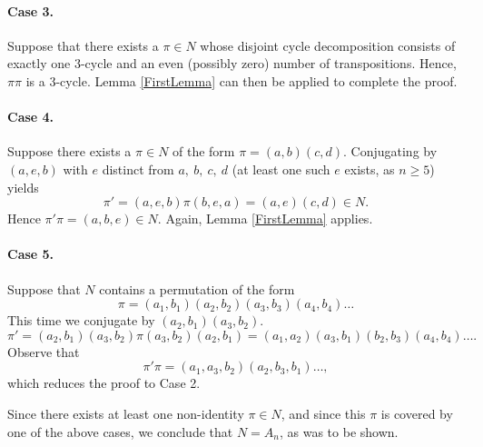 \documentclass[12pt]{article}
\begin{document}
\paragraph{Case 3.}
Suppose that there exists a $\pi \in N$ whose disjoint cycle
decomposition consists of exactly one $3$-cycle and an even (possibly
zero) number of transpositions.  Hence, $\pi \pi$ is a $3$-cycle.
Lemma \ref{FirstLemma} can then be applied to complete the proof.

\paragraph{Case 4.}
Suppose there exists a $\pi \in N$ of the form $\pi = (a,b)(c,d)$.
Conjugating by $(a,e,b)$ with $e$ distinct from $a,~b,~c,~d$ (at least
one such $e$ exists, as $n \geq 5$) yields
\[
\pi' = (a,e,b)\pi(b,e,a) = (a,e)(c,d) \in N.
\]
Hence $\pi' \pi = (a,b,e) \in N$.  Again, Lemma \ref{FirstLemma} applies.

\paragraph{Case 5.}
Suppose that $N$ contains a permutation of the form 
\[\pi = (a_1,
b_1)(a_2, b_2)(a_3, b_3)(a_4, b_4)\ldots\] This time we conjugate by
$(a_2, b_1)(a_3, b_2)$.
\[
\pi' = (a_2,b_1)(a_3,b_2) \pi (a_3, b_2)(a_2,b_1) = (a_1,
a_2)(a_3,b_1)(b_2,b_3)(a_4,b_4) \ldots.
\]
Observe that 
\[ \pi' \pi = (a_1, a_3, b_2)(a_2, b_3, b_1) \ldots , \]
which reduces the proof to Case 2.

Since there exists at least one non-identity $\pi\in N$, and since this
$\pi$ is covered by one of the above cases, we conclude that $N =
A_n$, as was to be shown.

\end{document}
